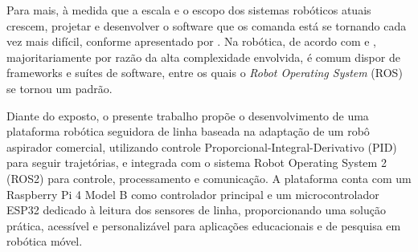 Para mais, à medida que a escala e o escopo dos sistemas robóticos atuais crescem, projetar e desenvolver o software que os comanda está se tornando cada vez mais difícil, conforme apresentado por . Na robótica, de acordo com  e , majoritariamente por razão da alta complexidade envolvida, é comum dispor de frameworks e suítes de software, entre os quais o \textit{Robot Operating System} (ROS) se tornou um padrão.

Diante do exposto, o presente trabalho propõe o desenvolvimento de uma plataforma robótica seguidora de linha baseada na adaptação de um robô aspirador comercial, utilizando controle Proporcional-Integral-Derivativo (PID) para seguir trajetórias, e integrada com o sistema Robot Operating System 2 (ROS2) para controle, processamento e comunicação. A plataforma conta com um Raspberry Pi 4 Model B como controlador principal e um microcontrolador ESP32 dedicado à leitura dos sensores de linha, proporcionando uma solução prática, acessível e personalizável para aplicações educacionais e de pesquisa em robótica móvel.